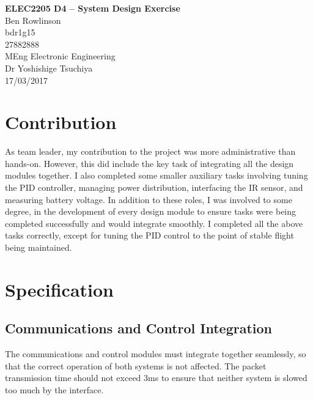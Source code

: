 \documentclass[a4paper,11pt]{article}
\begin{document}
  
\begin{center}
{\Large{\textbf{ELEC2205 D4 -- System Design Exercise}}} \\ [\baselineskip]
Ben Rowlinson\\
bdr1g15\\
27882888\\
MEng Electronic Engineering\\
Dr Yoshishige Tsuchiya\\
17/03/2017\\
\end{center}

\tableofcontents

\listoffigures

\mbox{}
\printnomenclature
\newpage

\section{Contribution}
As team leader, my contribution to the project was more administrative than hands-on. However, this did include the key task of integrating all the design modules together. I also completed some smaller auxiliary tasks involving tuning the PID controller, managing power distribution, interfacing the IR sensor, and measuring battery voltage. In addition to these roles, I was involved to some degree, in the development of every design module to ensure tasks were being completed successfully and would integrate smoothly. 
I completed all the above tasks correctly, except for tuning the PID control to the point of stable flight being maintained.

 
\section{Specification}
\subsection{Communications and Control Integration}
The communications and control modules must integrate together seamlessly, so that the correct operation of both systems is not affected. The packet transmission time should not exceed 3ms to ensure that neither system is slowed too much by the interface.
\end{document}

